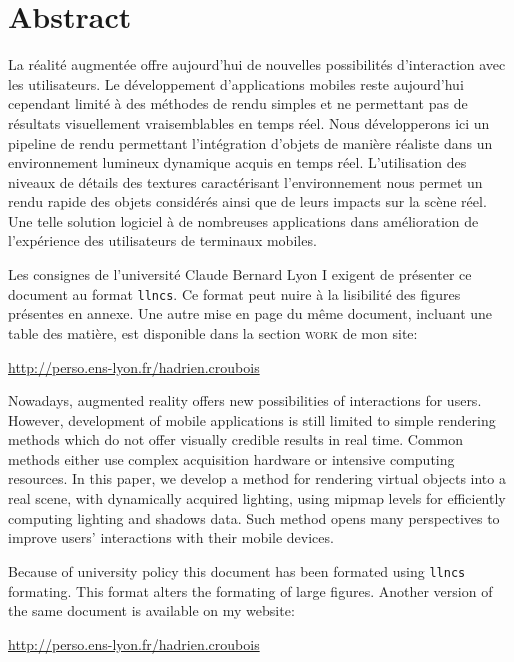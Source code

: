 \documentclass[10pt,a4paper,twoside, twocolumn]{report}
\begin{document}
\vfill

{}
\section*{Abstract}


  \vfill
  
	La réalité augmentée offre aujourd'hui de nouvelles possibilités d’interaction avec les utilisateurs. Le développement d'applications mobiles reste aujourd'hui cependant limité à des méthodes de rendu simples et ne permettant pas de résultats visuellement vraisemblables en temps réel. Nous développerons ici un pipeline de rendu permettant l’intégration d'objets de manière réaliste dans un environnement lumineux dynamique acquis en temps réel. L'utilisation des niveaux de détails des textures caractérisant l'environnement nous permet un rendu rapide des objets considérés ainsi que de leurs impacts sur la scène réel. Une telle solution logiciel à de nombreuses applications dans amélioration de l’expérience des utilisateurs de terminaux mobiles.

	\ifllncs
	Les consignes de l'université Claude Bernard Lyon I exigent de présenter ce document au format \texttt{llncs}. Ce format peut nuire à la lisibilité des figures présentes en annexe. Une autre mise en page du même document, incluant une table des matière, est disponible dans la section \textsc{work} de mon site:

	\begin{center}\href{http://perso.ens-lyon.fr/hadrien.croubois}{http://perso.ens-lyon.fr/hadrien.croubois}\end{center}
	\fi

	\vspace{1cm}
	Nowadays, augmented reality offers new possibilities of interactions for users. However, development of mobile applications is still limited to simple rendering methods which do not offer visually credible  results in real time. Common methods either use complex acquisition hardware or intensive computing resources. In this paper, we develop a method for rendering virtual objects into a real scene, with dynamically acquired lighting, using mipmap levels for efficiently computing lighting and shadows data. Such method opens many perspectives to improve users’ interactions with their mobile devices.

	\ifllncs
	Because of university policy this document has been formated using \texttt{llncs} formating. This format alters the formating of large figures. Another version of the same document is available on my website:

	\begin{center}\href{http://perso.ens-lyon.fr/hadrien.croubois}{http://perso.ens-lyon.fr/hadrien.croubois}\end{center}
	\fi

  \vfill
\end{document}
